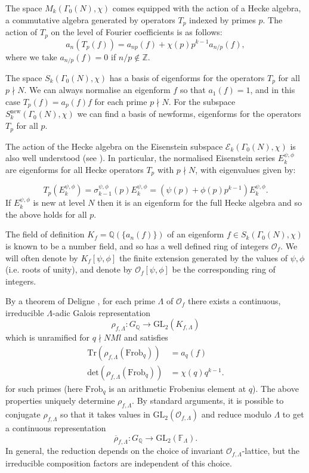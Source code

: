\documentclass{amsart}
\theoremstyle{plain}
\theoremstyle{definition}
\newcommand*{\field}[1]{\mathbb{#1}}
\begin{document}
The space $M_k(\Gamma_0(N),\chi)$ comes equipped with the action of a Hecke algebra, a commutative algebra generated by operators $T_p$ indexed by primes $p$. The action of $T_p$ on the level of Fourier coefficients is as follows: 
\begin{equation*}
    a_n(T_p(f)) = a_{np}(f) + \chi(p)p^{k-1}a_{n/p}(f),
\end{equation*}
where we take $a_{n/p}(f)=0$ if $n/p \notin \field{Z}$. 

The space $S_k(\Gamma_0(N),\chi)$ has a basis of eigenforms for the operators $T_p$ for all $p\nmid N$. We can always normalise an eigenform $f$ so that $a_1(f) = 1$, and in this case $T_p(f) = a_p(f)f$ for each prime $p\nmid N$. For the subspace $S_k^{\text{new}}(\Gamma_0(N),\chi)$ we can find a basis of newforms, eigenforms for the operators $T_p$ for all $p$.

The action of the Hecke algebra on the Eisenstein subspace $\mathcal{E}_k(\Gamma_0(N),\chi)$ is also well understood (see \cite[Proposition 5.2.3]{diamond_shurman_2016}). In particular, the normalised Eisenstein series $E_k^{\psi,\phi}$ are eigenforms for all Hecke operators $T_p$ with $p\nmid N$, with eigenvalues given by:

\begin{equation*}
    T_p(E_k^{\psi,\phi}) = \sigma_{k-1}^{\psi,\phi}(p)E_k^{\psi,\phi} = (\psi(p)+\phi(p)p^{k-1})E_k^{\psi,\phi}.
\end{equation*} If $E_k^{\psi,\phi}$ is new at level $N$ then it is an eigenform for the full Hecke algebra and so the above holds for all $p$.

The field of definition $K_f = \mathbb{Q}(\{a_n(f)\})$ of an eigenform $f\in S_k(\Gamma_0(N),\chi)$ is known to be a number field, and so has a well defined ring of integers $\mathcal{O}_f$. We will often denote by $K_f[\psi,\phi]$ the finite extension generated by the values of $\psi,\phi$ (i.e. roots of unity), and denote by $\mathcal{O}_f[\psi,\phi]$ be the corresponding ring of integers.

By a theorem of Deligne \cite{deligne_1969}, for each prime $\Lambda$ of $\mathcal{O}_f$ there exists a continuous, irreducible $\Lambda$-adic Galois representation \[\rho_{f,\Lambda}: G_{\mathbb{Q}} \rightarrow \text{GL}_2(K_{f,\Lambda})\] which is unramified for $q \nmid NMl$ and satisfies
\begin{align*}
    \text{Tr}(\rho_{f,\Lambda}(\text{Frob}_q)) &=a_q(f) \\ \text{det}(\rho_{f,\Lambda}(\text{Frob}_q)) &=\chi(q)q^{k-1}.
\end{align*} for such primes (here $\text{Frob}_q$ is an arithmetic Frobenius element at $q$). The above properties uniquely determine $\rho_{f,\Lambda}$.
By standard arguments, it is possible to conjugate $\rho_{f,\Lambda}$ so that it takes values in $\text{GL}_2(\mathcal{O}_{f,\Lambda})$ and reduce modulo $\Lambda$ to get a continuous representation \[\overline{\rho}_{f,\Lambda}:G_{\mathbb{Q}} \rightarrow \text{GL}_2(\mathbb{F}_{\Lambda}).\] In general, the reduction depends on the choice of invariant $\mathcal{O}_{f,\Lambda}$-lattice, but the irreducible composition factors are independent of this choice.
\end{document}
